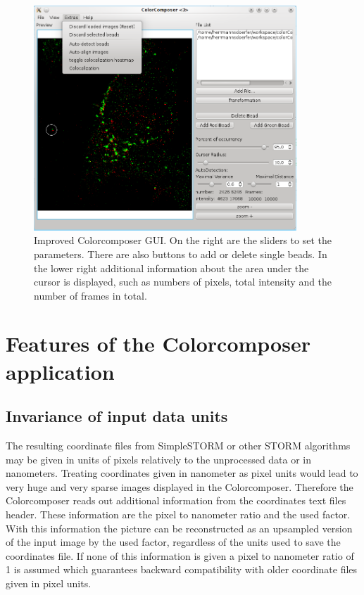 \begin{figure}
\centering
\includegraphics[width = 0.88\textwidth]{pictures/GuiColorcomposer/BeforeAlignmentWithMenu.png}
\caption{Improved Colorcomposer GUI. On the right are the sliders to set the parameters. There are also buttons to add or delete single beads. In the lower right additional information about the area under the cursor is displayed, such as numbers of pixels, total intensity and the number of frames in total.}
\label{Colorcomposer}
\end{figure}


\section{Features of the Colorcomposer application}
\subsection{Invariance of input data units}
The resulting coordinate files from SimpleSTORM or other STORM algorithms may be given in units of pixels relatively to the unprocessed data or in nanometers. Treating coordinates given in nanometer as pixel units would lead to very huge and very sparse images displayed in the Colorcomposer. Therefore the Colorcomposer reads out additional information from the coordinates text files header. These information are the pixel to nanometer ratio and the used factor. With this information the picture can be reconstructed as an upsampled version of the input image by the used factor, regardless of the units used to save the coordinates file. If none of this information is given a pixel to nanometer ratio of 1 is assumed which guarantees backward compatibility with older coordinate files given in pixel units.
